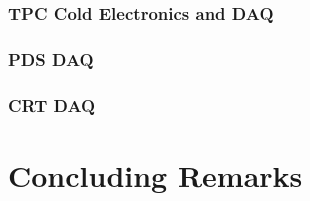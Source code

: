 \subsubsection{TPC Cold Electronics and DAQ}


\subsubsection{PDS DAQ}

\subsubsection{CRT DAQ}

\section{Concluding Remarks}
